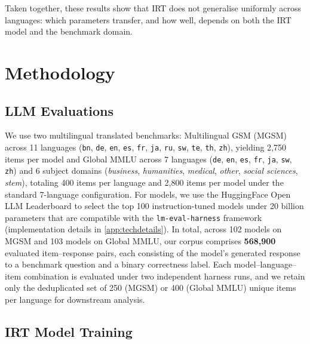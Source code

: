 \documentclass[11pt]{article}
\begin{document}
Taken together, these results show that IRT does not generalise uniformly across languages: which parameters transfer, and how well, depends on both the IRT model and the benchmark domain. 


\section{Methodology} 
\label{sec:methodology}


\subsection{LLM Evaluations}

We use two multilingual translated benchmarks: Multilingual GSM (MGSM) \cite{shi2023language} across 11 languages (\texttt{bn}, \texttt{de}, \texttt{en}, \texttt{es}, \texttt{fr}, \texttt{ja}, \texttt{ru},
\texttt{sw}, \texttt{te}, \texttt{th}, \texttt{zh}), yielding 2{,}750 items per model and Global MMLU \cite{singh2025global} across 7 languages (\texttt{de}, \texttt{en}, \texttt{es},
\texttt{fr}, \texttt{ja}, \texttt{sw}, \texttt{zh}) and 6 subject domains
(\textit{business}, \textit{humanities}, \textit{medical}, \textit{other},
\textit{social sciences}, \textit{stem}), totaling 400 items per language and 2{,}800 items per model under the standard 7-language configuration. For models, we use the HuggingFace Open LLM Leaderboard to select the top 100 instruction-tuned models under 20 billion parameters that are compatible with the \verb|lm-eval-harness| framework \cite{eval-harness} (implementation details in \autoref{app:techdetails}). In total, across 102 models on MGSM and 103 models on Global MMLU, our corpus comprises \textbf{568{,}900} evaluated item--response pairs, each consisting of the model's generated response to a benchmark question and a binary correctness label. Each model--language--item combination is evaluated under two independent harness runs, and we retain only the deduplicated set of 250 (MGSM) or 400 (Global MMLU) unique items per language for downstream analysis. 


\subsection{IRT Model Training}
\end{document}

